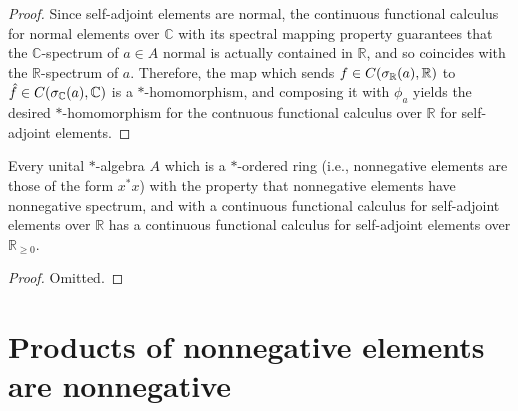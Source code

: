 \begin{proof}
  \leanok
  Since self-adjoint elements are normal, the continuous functional calculus for normal elements over $\mathbb{C}$ with its spectral mapping property guarantees that the $\mathbb{C}$-spectrum of $a \in A$ normal is actually contained in $\mathbb{R}$, and so coincides with the $\mathbb{R}$-spectrum of $a$.
  Therefore, the map which sends $f \in C(\spectrum[\mathbb{R}]{a}, \mathbb{R})$ to $\hat f \in C(\spectrum[\mathbb{C}]{a}, \mathbb{C})$ is a $*$-homomorphism, and composing it with $\phi_a$ yields the desired $*$-homomorphism for the contnuous functional calculus over $\mathbb{R}$ for self-adjoint elements.
\end{proof}

\begin{theorem}
  \label{thm:cfc_real_to_nnreal}
  \mathlibok
  Every unital $*$-algebra $A$ which is a $*$-ordered ring (i.e., nonnegative elements are those of the form $x^* x$) with the property that nonnegative elements have nonnegative spectrum, and with a continuous functional calculus for self-adjoint elements over $\mathbb{R}$ has a continuous functional calculus for self-adjoint elements over $\mathbb{R}_{\ge 0}$.
\end{theorem}

\begin{proof}
  \leanok
  Omitted.
\end{proof}


\section{Products of nonnegative elements are nonnegative}

